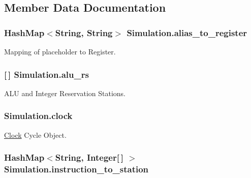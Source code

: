 \subsection{\-Member \-Data \-Documentation}
\hypertarget{classSimulation_a4ba6804e72f9296ddbaf07334c656267}{
\subsubsection[{alias\-\_\-to\-\_\-register}]{\setlength{\rightskip}{0pt plus 5cm}\-Hash\-Map$<$\-String, \-String$>$ {\bf \-Simulation.\-alias\-\_\-to\-\_\-register}}}\label{classSimulation_a4ba6804e72f9296ddbaf07334c656267}


\-Mapping of placeholder to \-Register. 

\hypertarget{classSimulation_a088d8379681674f73ff28d67fa15c4b1}{
\subsubsection[{alu\-\_\-rs}]{ \mbox{[}$\,$\mbox{]} {\bf \-Simulation.\-alu\-\_\-rs}}}\label{classSimulation_a088d8379681674f73ff28d67fa15c4b1}


\-A\-L\-U and \-Integer \-Reservation \-Stations. 

\hypertarget{classSimulation_af485d36c87120ad92b39bbea3e363cda}{
\subsubsection[{clock}]{ {\bf \-Simulation.\-clock}}}\label{classSimulation_af485d36c87120ad92b39bbea3e363cda}


\hyperlink{classClock}{\-Clock} \-Cycle \-Object. 

\hypertarget{classSimulation_aa1da0fd99a66e4f3290cab75db0498ba}{
\subsubsection[{instruction\-\_\-to\-\_\-station}]{\setlength{\rightskip}{0pt plus 5cm}\-Hash\-Map$<$\-String, \-Integer\mbox{[}$\,$\mbox{]} $>$ {\bf \-Simulation.\-instruction\-\_\-to\-\_\-station}}}\label{classSimulation_aa1da0fd99a66e4f3290cab75db0498ba}


